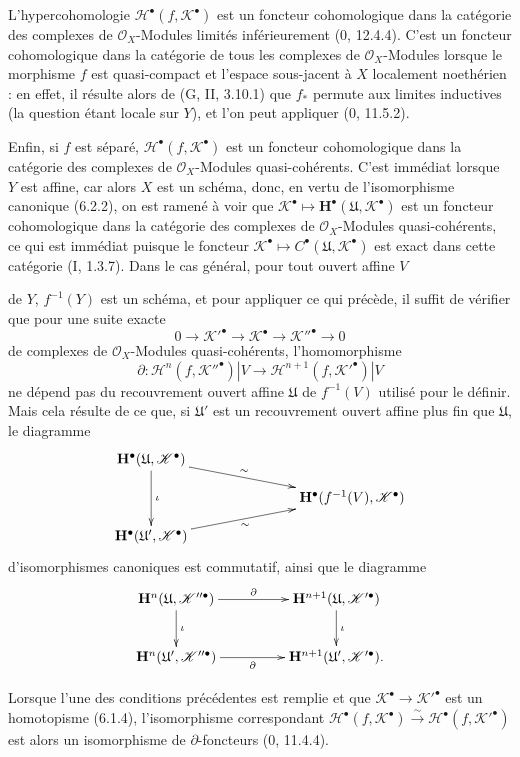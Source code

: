 \begin{env}[6.2.6]
L'hypercohomologie $\mathscr H^\bullet(f,\mathscr K^\bullet)$ est un foncteur
cohomologique dans la catégorie des complexes de $\mathscr O_X$-Modules
limités inférieurement (0, 12.4.4). C'est un foncteur cohomologique dans la
catégorie de tous les complexes de $\mathscr O_X$-Modules lorsque le
morphisme $f$ est quasi-compact et l'espace sous-jacent à $X$ localement
noethérien : en effet, il résulte alors de (G, II, 3.10.1) que $f_*$ permute
aux limites inductives (la question étant locale sur $Y$), et l'on peut
appliquer (0, 11.5.2).

Enfin, si $f$ est séparé, $\mathscr H^\bullet(f,\mathscr K^\bullet)$ est un
foncteur cohomologique dans la catégorie des complexes de
$\mathscr O_X$-Modules quasi-cohérents. C'est immédiat lorsque $Y$ est
affine, car alors $X$ est un schéma, donc, en vertu de l'isomorphisme
canonique (6.2.2), on est ramené à voir que
$\mathscr K^\bullet\mapsto\mathbf H^\bullet(\mathfrak U,\mathscr K^\bullet)$
est un foncteur cohomologique dans la catégorie des complexes de
$\mathscr O_X$-Modules quasi-cohérents, ce qui est immédiat puisque le
foncteur $\mathscr K^\bullet\mapsto
C^\bullet(\mathfrak U,\mathscr K^\bullet)$ est exact dans cette catégorie
(I, 1.3.7). Dans le cas général, pour tout ouvert affine $V$


de $Y$, $f^{-1}(Y)$ est un schéma, et pour appliquer ce qui précède, il
suffit de vérifier que pour une suite exacte
\[
  0\longrightarrow\mathscr K'^\bullet
  \longrightarrow\mathscr K^\bullet
  \longrightarrow\mathscr K''^\bullet
  \longrightarrow0
\]
de complexes de $\mathscr O_X$-Modules quasi-cohérents, l'homomorphisme
\[
  \partial:
  \mathscr H^n(f,\mathscr K''^\bullet)|V
  \longrightarrow
  \mathscr H^{n+1}(f,\mathscr K'^\bullet)|V
\]
ne dépend pas du recouvrement ouvert affine $\mathfrak U$ de $f^{-1}(V)$
utilisé pour le définir. Mais cela résulte de ce que, si $\mathfrak U'$ est
un recouvrement ouvert affine plus fin que $\mathfrak U$, le diagramme
\[
  \xymatrix@C=34pt@R=11pt{
    \mathbf H^\bullet(\mathfrak U,\mathscr K^\bullet)
      \ar[rrd]^-{\sim}\ar[dd]^{\iota}
    && \\
    &&
    \mathbf H^\bullet(f^{-1}(V),\mathscr K^\bullet)
    \\
    \mathbf H^\bullet(\mathfrak U',\mathscr K^\bullet)
      \ar[rru]_-{\sim}
    &&
  }
\]
d'isomorphismes canoniques est commutatif, ainsi que le diagramme
\[
  \xymatrix@C=46pt@R=25pt{
    \mathbf H^n(\mathfrak U,\mathscr K''^\bullet)
      \ar[r]^-{\partial}\ar[d]^{\iota}
    &
    \mathbf H^{n+1}(\mathfrak U,\mathscr K'^\bullet)
      \ar[d]^{\iota}
    \\
    \mathbf H^n(\mathfrak U',\mathscr K''^\bullet)
      \ar[r]_-{\partial}
    &
    \mathbf H^{n+1}(\mathfrak U',\mathscr K'^\bullet).
  }
\]

Lorsque l'une des conditions précédentes est remplie et que
$\mathscr K^\bullet\to\mathscr K'^\bullet$ est un homotopisme (6.1.4),
l'isomorphisme correspondant
$\mathscr H^\bullet(f,\mathscr K^\bullet)\xrightarrow{\sim}
\mathscr H^\bullet(f,\mathscr K'^\bullet)$ est alors un isomorphisme de
$\partial$-foncteurs (0, 11.4.4).
\end{env}

